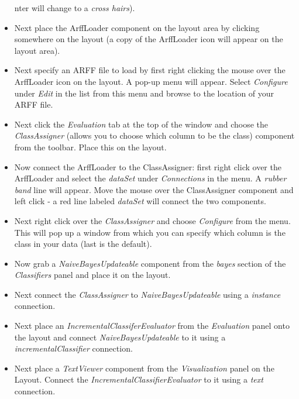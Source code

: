 \documentclass[a4paper]{article}
\begin{document}
\begin{itemize}
nter will change to a \textit{cross hairs}).

	\item Next place the ArffLoader component on the layout area by clicking
	somewhere on the layout (a copy of the ArffLoader icon will appear on
	the layout area).

	\item Next specify an ARFF file to load by first right clicking the mouse
	over the ArffLoader icon on the layout. A pop-up menu will
	appear. Select \textit{Configure} under \textit{Edit} in the list from this menu and
	browse to the location of your ARFF file.

	\item Next click the \textit{Evaluation} tab at the top of the window and choose the
	\textit{ClassAssigner} (allows you to choose which column to be the class)
	component from the toolbar. Place this on the layout.

	\item Now connect the ArffLoader to the ClassAssigner: first right click
	over the ArffLoader and select the \textit{dataSet} under \textit{Connections} in
	the menu. A \textit{rubber band} line will appear. Move the mouse over the
	ClassAssigner component and left click - a red line labeled \textit{dataSet}
	will connect the two components.

	\item Next right click over the \textit{ClassAssigner} and choose \textit{Configure} from
	the menu. This will pop up a window from which you can specify which
	column is the class in your data (last is the default).

        \item Now grab a \textit{NaiveBayesUpdateable} component from the \textit{bayes}
        section of the \textit{Classifiers} panel and place it on the layout.

        \item Next connect the \textit{ClassAssigner} to \textit{NaiveBayesUpdateable}
        using a \textit{instance} connection.

        \item Next place an \textit{IncrementalClassiferEvaluator} from the \textit{Evaluation}
        panel onto the layout and connect \textit{NaiveBayesUpdateable} to it using a
        \textit{incrementalClassifier} connection.

        \item Next place a \textit{TextViewer} component from the \textit{Visualization}
        panel on the Layout. Connect the \textit{IncrementalClassifierEvaluator} to
        it using a \textit{text} connection.


\end{itemize}
\end{document}
